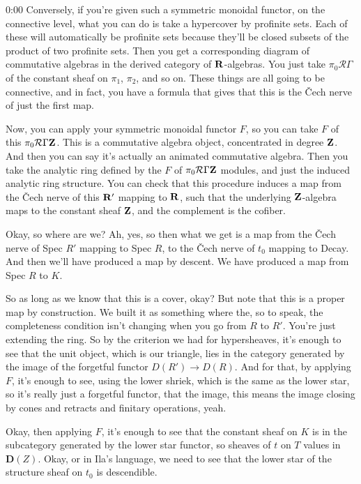 \begin{unfinished}{0:00}
Conversely, if you're given such a symmetric monoidal functor, on the connective level, what you can do is take a hypercover by profinite sets. Each of these will automatically be profinite sets because they'll be closed subsets of the product of two profinite sets. Then you get a corresponding diagram of commutative algebras in the derived category of $\mathbf R$-algebras. You just take $\pi_0 \mathcal{R}\Gamma$ of the constant sheaf on $\pi_1$, $\pi_2$, and so on. These things are all going to be connective, and in fact, you have a formula that gives that this is the Čech nerve of just the first map.

Now, you can apply your symmetric monoidal functor $F$, so you can take $F$ of this $\pi_0 \mathcal{R}\Gamma \mathbf Z$. This is a commutative algebra object, concentrated in degree $\mathbf Z$. And then you can say it's actually an animated commutative algebra. Then you take the analytic ring defined by the $F$ of $\pi_0 \mathcal{R}\Gamma \mathbf Z$ modules, and just the induced analytic ring structure. You can check that this procedure induces a map from the Čech nerve of this $\mathbf R'$ mapping to $\mathbf R$, such that the underlying $\mathbf Z$-algebra maps to the constant sheaf $\mathbf Z$, and the complement is the cofiber.

Okay, so where are we? Ah, yes, so then what we get is a map from the Čech nerve of Spec $R'$ mapping to Spec $R$, to the Čech nerve of $t_0$ mapping to Decay. And then we'll have produced a map by descent. We have produced a map from Spec $R$ to $K$. 

So as long as we know that this is a cover, okay? But note that this is a proper map by construction. We built it as something where the, so to speak, the completeness condition isn't changing when you go from $R$ to $R'$. You're just extending the ring. So by the criterion we had for hypersheaves, it's enough to see that the unit object, which is our triangle, lies in the category generated by the image of the forgetful functor $D(R') \to D(R)$. And for that, by applying $F$, it's enough to see, using the lower shriek, which is the same as the lower star, so it's really just a forgetful functor, that the image, this means the image closing by cones and retracts and finitary operations, yeah.

Okay, then applying $F$, it's enough to see that the constant sheaf on $K$ is in the subcategory generated by the lower star functor, so sheaves of $t$ on $T$ values in $\mathbf{D}(Z)$. Okay, or in Ila's language, we need to see that the lower star of the structure sheaf on $t_0$ is descendible.


\end{unfinished}
